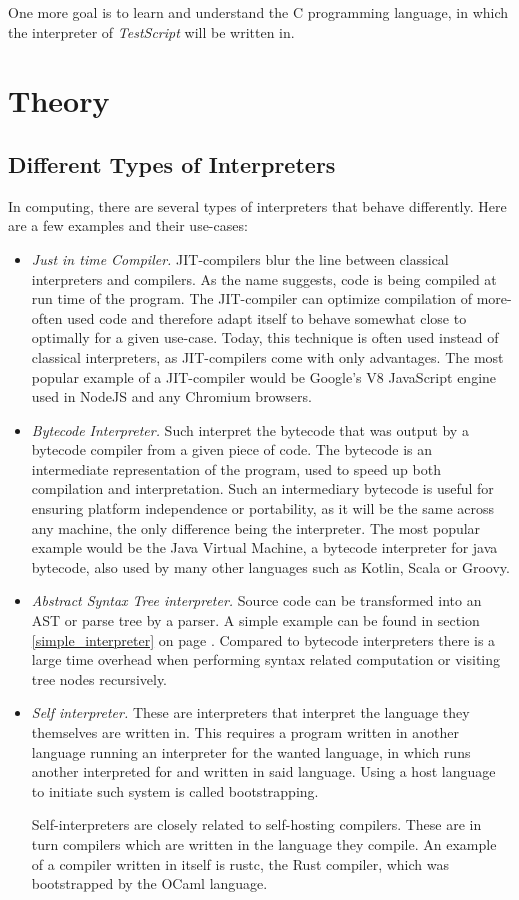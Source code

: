 \documentclass[12pt,a4paper]{article}
\newcommand{\name}{\emph{TestScript}}
\begin{document}
One more goal is to learn and understand the C programming language, in which
the interpreter of \name{} will be written in.

\section{Theory}
\subsection{Different Types of Interpreters}
In computing, there are several types of interpreters that behave differently.
Here are a few examples and their use-cases:
\begin{itemize}
    \item \emph{Just in time Compiler.} JIT-compilers blur the line between
        classical interpreters and compilers. As the name suggests, code is
        being compiled at run time of the program. The JIT-compiler can optimize
        compilation of more-often used code and therefore adapt itself to
        behave somewhat close to optimally for a given use-case. Today, this 
        technique is often used instead of classical interpreters, as
        JIT-compilers come with only advantages. The most popular example of
        a JIT-compiler would be Google's V8 JavaScript engine used
        in NodeJS and any Chromium browsers.
    \item \emph{Bytecode Interpreter.} Such interpret the bytecode that was
        output by a bytecode compiler from a given piece of code. The bytecode
        is an intermediate representation of the program, used to speed up
        both compilation and interpretation. Such an intermediary bytecode is
        useful for ensuring platform independence or portability, as it will be
        the same across any machine, the only difference being the interpreter.
        The most popular example would be the Java Virtual Machine,
        a bytecode interpreter for java bytecode, also used by many other languages
        such as Kotlin, Scala or Groovy.
    \item \emph{Abstract Syntax Tree interpreter.} Source code can be
        transformed into an AST or parse tree by a parser. A simple example
        can be found in section \ref{simple_interpreter}
        on page \pageref{simple_interpreter}. Compared to bytecode interpreters
        there is a large time overhead when performing syntax related computation
        or visiting tree nodes recursively.
    \item \emph{Self interpreter.} These are interpreters that interpret the
        language they themselves are written in. This requires a program
        written in another language running an interpreter for the wanted
        language, in which runs another interpreted for and written in said
        language. Using a host language to initiate such system is called
        bootstrapping.

        Self-interpreters are closely related to self-hosting compilers. These
        are in turn compilers which are written in the language they compile.
        An example of a compiler written in itself is rustc, the Rust
        compiler, which was bootstrapped by the OCaml language.
\end{itemize}
\end{document}
